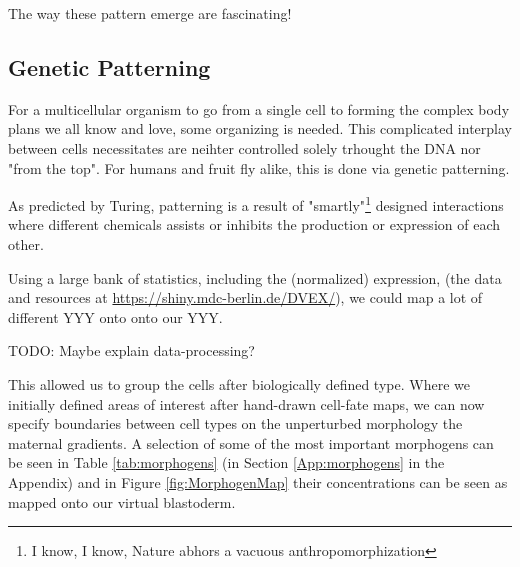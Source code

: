 The way these pattern emerge are fascinating! 



\subsection{Genetic Patterning}
\label{sec:gen_patterns}
For a multicellular organism to go from a single cell to forming the complex body plans we all know and love, some organizing is needed. This complicated interplay between cells necessitates are neihter controlled solely trhought the DNA nor "from the top". For humans and fruit fly alike, this is done via genetic patterning.\cite{veraksa2000developmental}

As predicted by Turing, patterning is a result of "smartly"\footnote{I know, I know, Nature abhors a vacuous anthropomorphization} designed interactions where different chemicals assists or inhibits the production or expression of each other. 


Using a large bank of statistics, including the (normalized) expression, (the data and resources at \url{https://shiny.mdc-berlin.de/DVEX/}), we could map a lot of different YYY onto onto our YYY. 

TODO: Maybe explain data-processing?

This allowed us to group the cells after biologically defined type. Where we initially defined areas of interest after hand-drawn cell-fate maps, we can now specify boundaries between cell types on the unperturbed morphology the maternal gradients. A selection of some of the most important morphogens can be seen in Table \ref{tab:morphogens} (in Section \ref{App:morphogens} in the Appendix) and in Figure \ref{fig:MorphogenMap} their concentrations can be seen as mapped onto our virtual blastoderm.


\noindent

